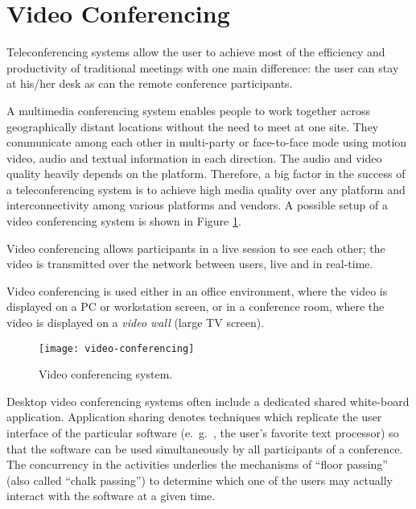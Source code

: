 \section{Video Conferencing}
Teleconferencing systems allow the user to achieve most of the efficiency and productivity of traditional meetings with one main difference: the user can stay at his/her desk as can the remote conference participants.

A multimedia conferencing system enables people to work together across geographically distant locations without the need to meet at one site. They communicate among each other in multi-party or face-to-face mode using motion video, audio and textual information in each direction. The audio and video quality heavily depends on the platform. Therefore, a big factor in the success of a teleconferencing system is to achieve high media quality over any platform and interconnectivity among various platforms and vendors. A possible setup of a video conferencing system is shown in Figure \ref{fig:video-conferencing}.

Video conferencing allows participants in a live session to see each other; the video is transmitted over the network between users, live and in real-time.

Video conferencing is used either in an office environment, where the video is displayed on a PC or workstation screen, or in a conference room, where the video is displayed on a \textit{video wall} (large TV screen).
\begin{figure}[hpt]
	\centering
	\texttt{[image: video-conferencing]}
	\caption{Video conferencing system.}\label{fig:video-conferencing}
\end{figure}

Desktop video conferencing systems often include a dedicated shared white-board application. Application sharing denotes techniques which replicate the user interface of the
particular software (e.\ g.\ , the user's favorite text processor) so that the software can be used simultaneously by all participants of a conference. The concurrency in the
activities underlies the mechanisms of ``floor passing'' (also called ``chalk passing'') to determine which one of the users may actually interact with the software at a
given time.



